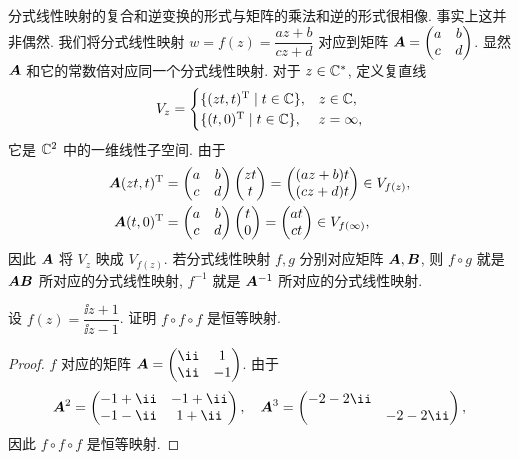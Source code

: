 分式线性映射的复合和逆变换的形式与矩阵的乘法和逆的形式很相像.
事实上这并非偶然.
我们将分式线性映射 $w=f(z)=\dfrac{az+b}{cz+d}$ 对应到矩阵 ${\boldsymbol{A}}=\begin{pmatrix}
  a&b\\c&d
\end{pmatrix}$.
显然 ${\boldsymbol{A}}$ 和它的常数倍对应同一个分式线性映射.
对于 $z\in{\mathbb{C}}^*$, 定义复直线
\[
  V_z=\begin{cases}
    \{(zt,t)^{\mathrm{T}}\mid t\in{\mathbb{C}}\},&z\in{\mathbb{C}},\\
    \{(t,0)^{\mathrm{T}}\mid t\in{\mathbb{C}}\},&z=\infty,
  \end{cases}
\]
它是 ${\mathbb{C}}^2$ 中的一维线性子空间.
由于
\begin{align*}
   {\boldsymbol{A}}(zt,t)^{\mathrm{T}}&
  =\begin{pmatrix}
    a&b\\
    c&d
  \end{pmatrix}\begin{pmatrix}
    zt\\
    t
  \end{pmatrix}
  =\begin{pmatrix}
    (az+b)t\\
    (cz+d)t
  \end{pmatrix}\in V_{f(z)},\\
   {\boldsymbol{A}}(t,0)^{\mathrm{T}}&
  =\begin{pmatrix}
    a&b\\
    c&d
  \end{pmatrix}\begin{pmatrix}
    t\\
    0
  \end{pmatrix}
  =\begin{pmatrix}
    at\\
    ct
  \end{pmatrix}\in V_{f(\infty)},
\end{align*}
因此 ${\boldsymbol{A}}$ 将 $V_z$ 映成 $V_{f(z)}$.
若分式线性映射 $f,g$ 分别对应矩阵 ${\boldsymbol{A}},{\boldsymbol{B}}$, 则 $f\circ g$ 就是 ${\boldsymbol{A}}{\boldsymbol{B}}$ 所对应的分式线性映射, $f^{-1}$ 就是 ${\boldsymbol{A}}^{-1}$ 所对应的分式线性映射.

\begin{example}
  设 $f(z)=\dfrac{\ii z+1}{\ii z-1}$.
  证明 $f\circ f\circ f$ 是恒等映射.
\end{example}

\begin{proof}
  $f$ 对应的矩阵 $\bfA=\begin{pmatrix}
    \ii&1\\
    \ii&-1
  \end{pmatrix}$.
  由于
  \[
    \bfA^2=\begin{pmatrix}
      -1+\ii&-1+\ii\\
      -1-\ii&1+\ii
    \end{pmatrix},\quad
    \bfA^3=\begin{pmatrix}
      -2-2\ii&\\
      &-2-2\ii
    \end{pmatrix},
  \]
  因此 $f\circ f\circ f$ 是恒等映射.
\end{proof}

